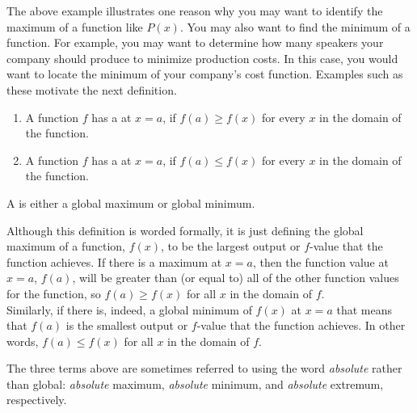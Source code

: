 \documentclass{ximera}
\begin{document}
The above example illustrates one reason why you may want to identify the maximum of a function like $P(x)$.  You may also want to find the minimum of a function.  For example, you may want to determine how many speakers your company should produce to minimize production costs.  In this case, you would want to locate the minimum of your company's cost function.  Examples such as these motivate the next definition. 

\begin{definition}\hfil{}
\begin{enumerate}
\item A function $f$ has a  at $x=a$, if $f(a)\ge
  f(x)$ for every $x$ in the domain of the function.
\item A function $f$ has a  at $x=a$, if $f(a)\le
  f(x)$ for every $x$ in the domain of the function.
\end{enumerate} 
A  is either a
global maximum or global minimum.  
\end{definition}

\begin{explanation}
Although this definition is worded formally, it is just defining the global maximum of a function, $f(x)$, to be the largest output or $f$-value that the function achieves.  If there is a maximum at $x=a$, then the function value at $x=a$, $f(a)$, will be greater than (or equal to) all of the other function values for the function, so $f(a) \geq f(x)$ for all $x$ in the domain of $f$.  \\

Similarly, if there is, indeed, a global minimum of $f(x)$ at $x=a$ that means that $f(a)$ is the smallest output or $f$-value that the function achieves.  In other words, $f(a) \leq f(x)$ for all $x$ in the domain of $f$. \\
\end{explanation}

\begin{warning}
The three terms above are sometimes referred to using the word \textit{absolute} rather than global: \textit{absolute} maximum, \textit{absolute} minimum, and \textit{absolute} extremum, respectively.
\end{warning}
\end{document}
